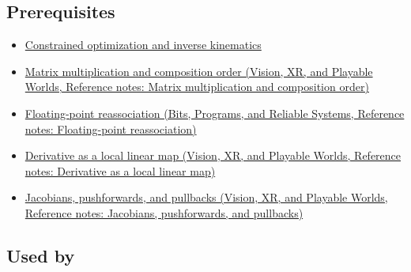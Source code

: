 \subsection{Prerequisites}\label{appendix-40df0855b4a7-prerequisites}

\begin{itemize}
\tightlist
\item
  \hyperref[appendix-29f4bea4c2bb]{Constrained optimization and inverse kinematics}
\item
  \href{../07-Vision-XR-and-Playable-Worlds/main.pdf\#nameddest=appendix-ab31ef447dbf}{Matrix multiplication and composition order (Vision, XR, and Playable Worlds, Reference notes: Matrix multiplication and composition order)}
\item
  \href{../01-Bits-Programs-and-Reliable-Systems/main.pdf\#nameddest=appendix-c2ac4a84c283}{Floating-point reassociation (Bits, Programs, and Reliable Systems, Reference notes: Floating-point reassociation)}
\item
  \href{../07-Vision-XR-and-Playable-Worlds/main.pdf\#nameddest=appendix-7bc181935c42}{Derivative as a local linear map (Vision, XR, and Playable Worlds, Reference notes: Derivative as a local linear map)}
\item
  \href{../07-Vision-XR-and-Playable-Worlds/main.pdf\#nameddest=appendix-d8a7ddb675eb}{Jacobians, pushforwards, and pullbacks (Vision, XR, and Playable Worlds, Reference notes: Jacobians, pushforwards, and pullbacks)}
\end{itemize}

\subsection{Used by}\label{appendix-40df0855b4a7-used-by}

